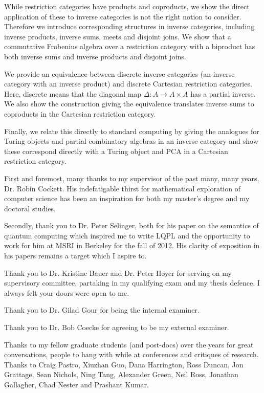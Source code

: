 \documentclass{ucalgthes1}
\begin{document}
While restriction categories have products and coproducts, we show the direct application of these
to inverse categories is not the right notion to consider. Therefore we introduce corresponding
structures in inverse categories, including inverse products, inverse sums, meets and disjoint
joins. We show that a commutative Frobenius algebra over a restriction category with a biproduct has
both inverse sums and inverse products and disjoint joins.

We provide an equivalence between discrete inverse categories (an inverse category with an inverse
product) and discrete Cartesian restriction categories. Here, discrete means that the diagonal map
$\Delta:A \to A\times A$ has a partial inverse. We also show the construction giving the equivalence
translates inverse sums to coproducts in the Cartesian restriction category.

Finally, we relate this directly to standard computing by giving the analogues for Turing objects
and partial combinatory algebras in an inverse category and show these correspond directly with a
Turing object and PCA in a Cartesian restriction category.


\newpage
{}
{}

First and foremost, many thanks to my supervisor of the past many, many years, Dr. Robin
Cockett. His indefatigable thirst for mathematical exploration of computer science has been an
inspiration for both my master's degree and my doctoral studies.

Secondly, thank you to Dr. Peter Selinger, both for his paper on the semantics of quantum computing
which inspired me to write LQPL and the opportunity to work for him at MSRI in Berkeley for the fall
of 2012. His clarity of exposition in his papers remains a target which I  aspire to.

Thank you to Dr. Kristine Bauer and Dr. Peter Høyer for serving on my supervisory committee,
partaking in my qualifying exam and my thesis defence. I always felt your doors were open to me.

Thank you to Dr. Gilad Gour for being the internal examiner.

Thank you to Dr. Bob Coecke for agreeing to be my external examiner.

Thanks to my fellow graduate students (and post-docs) over the years for great conversations, people
to hang with while at conferences and critiques of research. Thanks to Craig Pastro, Xiuzhan Guo,
Dana Harrington, Ross Duncan, Jon Grattage, Sean Nichols, Ning Tang, Alexander Green, Neil Ross,
Jonathan Gallagher, Chad Nester and Prashant Kumar.
\end{document}
